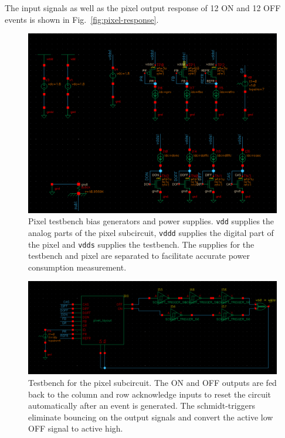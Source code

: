 The input signals as well as the pixel output response of 12 ON and 12 OFF events is shown in Fig.~\ref{fig:pixel-response}. 
\begin{figure}
    \center
    \includegraphics[width=\textwidth]{pixel_tb_bias.png}
    \caption{Pixel testbench bias generators and power supplies. \texttt{vdd} supplies the analog parts of the pixel
    subcircuit, \texttt{vddd} supplies the digital part of the pixel and \texttt{vdds} supplies the testbench. The
    supplies for the testbench and pixel are separated to facilitate accurate power consumption measurement.}
    \label{fig:tb-bias}
\end{figure}
\begin{figure}
    \center
    \includegraphics[width=\textwidth]{pixel_tb_pixel.png}
    \caption{Testbench for the pixel subcircuit. The ON and OFF outputs are fed back to the column and row acknowledge
    inputs to reset the circuit automatically after an event is generated. The schmidt-triggers eliminate bouncing on the
    output signals and convert the active low OFF signal to active high.}
    \label{fig:tb-pixel}
\end{figure}

